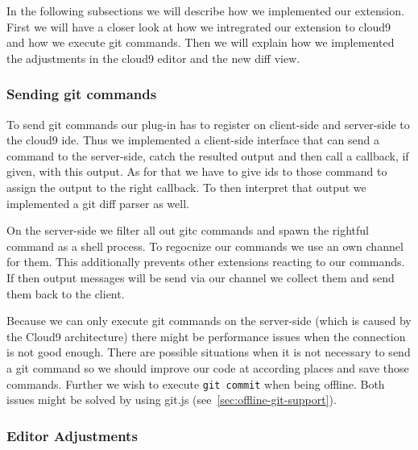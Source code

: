 In the following subsections we will describe how we implemented our extension.
First we will have a closer look at how we intregrated our extension to cloud9 and how we execute git commands.
Then we will explain how we implemented the adjustments in the cloud9 editor and the new diff view.

\subsubsection{Sending git commands}

To send git commands our plug-in has to register on client-side and server-side to the cloud9 ide.
Thus we implemented a client-side interface that can send a command to the server-side, catch the resulted output and then call a callback, if given, with this output.
As for that we have to give ids to those command to assign the output to the right callback.
To then interpret that output we implemented a git diff parser as well. 

On the server-side we filter all out gitc commands and spawn the rightful command as a shell process.
To regocnize our commands we use an own channel for them.
This additionally prevents other extensions reacting to our commands.
If then output messages will be send via our channel we collect them and send them back to the client.

Because we can only execute git commands on the server-side (which is caused by the Cloud9 architecture) there might be performance issues when the connection is not good enough.
There are possible situations when it is not necessary to send a git command so we should improve our code at according places and save those commands.
Further we wish to execute \texttt{git commit} when being offline.
Both issues might be solved by using git.js (see~\ref{sec:offline-git-support}).

\subsubsection{Editor Adjustments}

